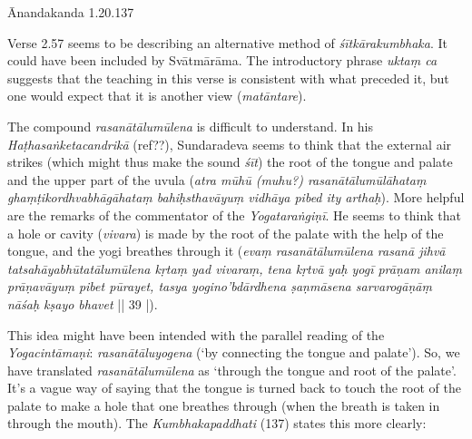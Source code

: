 \begin{ekdosis}
\begin{testimonia}[hp02_057]
\begin{versinnote}
\end{versinnote}

Ānandakanda 1.20.137

\begin{versinnote}
\end{versinnote}
\end{testimonia}

\begin{philcomm}[hp02_057]
Verse 2.57 seems to be describing an alternative method of \emph{śītkārakumbhaka}. It could have been included by Svātmārāma. The introductory phrase \emph{uktaṃ ca} suggests that the teaching in this verse is consistent with what preceded it, but one would expect that it is another view (\emph{matāntare}).

The compound \emph{rasanātālumūlena} is difficult to understand. In his \emph{Haṭhasaṅketacandrikā} (ref??), Sundaradeva seems to think that the external air strikes (which might thus make the sound \emph{śīt}) the root of the tongue and palate and the upper part of the uvula (\emph{atra mūhū (muhu?) rasanātālumūlāhataṃ ghaṃṭikordhvabhāgāhataṃ bahiḥsthavāyuṃ vidhāya pibed ity arthaḥ}). More helpful are the remarks of the commentator of the \emph{Yogataraṅgiṇī}. He seems to think that a hole or cavity (\emph{vivara}) is made by the root of the palate with the help of the tongue, and the yogi breathes through it (\emph{evaṃ rasanātālumūlena rasanā jihvā tatsahāyabhūtatālumūlena kṛtaṃ yad vivaraṃ, tena kṛtvā yaḥ yogī prāṇam anilaṃ prāṇavāyuṃ pibet pūrayet, tasya yogino’bdārdhena ṣaṇmāsena sarvarogāṇāṃ nāśaḥ kṣayo bhavet} || 39 |).

This idea might have been intended with the parallel reading of the \emph{Yogacintāmaṇi}: \emph{rasanātāluyogena} (‘by connecting the tongue and palate'). So, we have translated \emph{rasanātālumūlena} as ‘through the tongue and root of the palate’. It’s a vague way of saying that the tongue is turned back to touch the root of the palate to make a hole that one breathes through (when the breath is taken in through the mouth). The \emph{Kumbhakapaddhati} (137) states this more clearly:


\end{philcomm}
\end{ekdosis}
